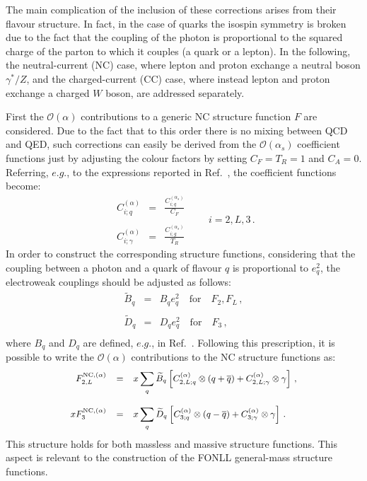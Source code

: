 The main complication of the inclusion of these corrections arises
from their flavour structure. In fact, in the case of quarks the
isospin symmetry is broken due to the fact that the coupling of the
photon is proportional to the squared charge of the parton to which it
couples (a quark or a lepton). In the following, the neutral-current
(NC) case, where lepton and proton exchange a neutral boson
$\gamma^*/Z$, and the charged-current (CC) case, where instead lepton
and proton exchange a charged $W$ boson, are addressed separately.

First the $\mathcal{O}(\alpha)$ contributions to a generic NC
structure function $F$ are considered. Due to the fact that to this
order there is no mixing between QCD and QED, such corrections can
easily be derived from the $\mathcal{O}(\alpha_s)$ coefficient
functions just by adjusting the colour factors by setting $C_F=T_R=1$
and $C_A=0$. Referring, $e.g.$, to the expressions reported in
Ref.~\cite{Ellis:1991qj}, the coefficient functions become:
\begin{equation}\label{eq:alphaCFs}
\begin{array}{rcl}
\displaystyle C_{i;q}^{(\alpha)} &=& \displaystyle \frac{C_{i;q}^{(\alpha_s)}}{C_F}\\
\\
\displaystyle C_{i;\gamma}^{(\alpha)} &=& \displaystyle \frac{C_{i;g}^{(\alpha_s)}}{T_R}
\end{array}\qquad i = 2,L,3\,.
\end{equation}
In order to construct the corresponding structure functions,
considering that the coupling between a photon and a quark of flavour
$q$ is proportional to $e_q^2$, the electroweak couplings should be
adjusted as follows:
 \begin{equation}
\begin{array}{rcl}
\widetilde{B}_q &=& B_qe_q^2\quad\mbox{for}\quad F_2,F_L\,, \\
\\
\widetilde{D}_q &=& D_qe_q^2\quad\mbox{for}\quad F_3\,, \\
\end{array}
\end{equation}
where $B_q$ and $D_q$ are defined, $e.g.$, in
Ref.~\cite{Adloff:2003uh}. Following this prescription, it is possible
to write the $\mathcal{O}(\alpha)$ contributions to the NC structure
functions as:
\begin{equation}
\small
\begin{array}{rcl}
F_{2,L}^{{\rm NC},(\alpha)} &=& \displaystyle x \sum_{q} \widetilde{B}_q\left[C_{2,L;q}^{(\alpha)}\otimes
(q+\overline{q}) + C_{2,L;\gamma}^{(\alpha)} \otimes \gamma
                         \right]\,,\\
\\
xF_3^{{\rm NC},(\alpha)} &=& \displaystyle x \sum_{q} \widetilde{D}_q\left[C_{3;q}^{(\alpha)}\otimes
(q-\overline{q}) + C_{3;\gamma}^{(\alpha)} \otimes \gamma
                         \right]\,.
\end{array}
\end{equation}
This structure holds for both massless and massive structure
functions. This aspect is relevant to the construction of the FONLL
general-mass structure functions.

